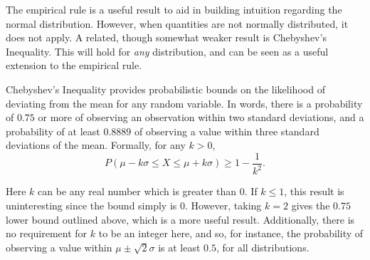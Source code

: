 \documentclass[
  letterpaper,
  DIV=11,
  numbers=noendperiod]{scrreprt}
\theoremstyle{definition}
\theoremstyle{definition}
\theoremstyle{definition}
\theoremstyle{remark}
\begin{document}
The empirical rule is a useful result to aid in building intuition
regarding the normal distribution. However, when quantities are not
normally distributed, it does not apply. A related, though somewhat
weaker result is Chebyshev's Inequality. This will hold for \emph{any}
distribution, and can be seen as a useful extension to the empirical
rule.

\begin{tcolorbox}[enhanced jigsaw, coltitle=black, colframe=quarto-callout-tip-color-frame, colbacktitle=quarto-callout-tip-color!10!white, bottomrule=.15mm, opacitybacktitle=0.6, colback=white, toptitle=1mm, arc=.35mm, leftrule=.75mm, bottomtitle=1mm, opacityback=0, breakable, rightrule=.15mm, title={Chebyshev's Inequality}, left=2mm, titlerule=0mm, toprule=.15mm]

Chebyshev's Inequality provides probabilistic bounds on the likelihood
of deviating from the mean for any random variable. In words, there is a
probability of \(0.75\) or more of observing an observation within two
standard deviations, and a probability of at least \(0.8889\) of
observing a value within three standard deviations of the mean.
Formally, for any \(k > 0\),
\[P(\mu - k\sigma \leq X \leq \mu + k\sigma) \geq 1 - \frac{1}{k^2}.\]

\end{tcolorbox}

Here \(k\) can be any real number which is greater than \(0\). If
\(k\leq 1\), this result is uninteresting since the bound simply is
\(0\). However, taking \(k=2\) gives the \(0.75\) lower bound outlined
above, which is a more useful result. Additionally, there is no
requirement for \(k\) to be an integer here, and so, for instance, the
probability of observing a value within \(\mu\pm\sqrt{2}\sigma\) is at
least \(0.5\), for all distributions.
\end{document}
